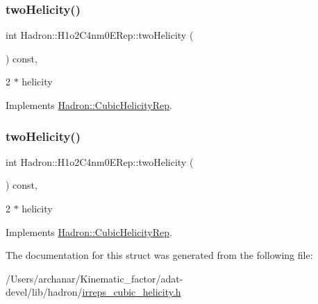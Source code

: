\subsubsection{\texorpdfstring{twoHelicity()}{twoHelicity()}\hspace{0.1cm}{\footnotesize\ttfamily [2/3]}}
{\footnotesize\ttfamily int Hadron\+::\+H1o2\+C4nm0\+E\+Rep\+::two\+Helicity (\begin{DoxyParamCaption}{ }\end{DoxyParamCaption}) const\hspace{0.3cm}{\ttfamily [inline]}, {\ttfamily [virtual]}}

2 $\ast$ helicity 

Implements \mbox{\hyperlink{structHadron_1_1CubicHelicityRep_af507aa56fc2747eacc8cb6c96db31ecc}{Hadron\+::\+Cubic\+Helicity\+Rep}}.

\mbox{\label{structHadron_1_1H1o2C4nm0ERep_a083d0736946f0404ac8639fd8a954a9d}} 
\subsubsection{\texorpdfstring{twoHelicity()}{twoHelicity()}\hspace{0.1cm}{\footnotesize\ttfamily [3/3]}}
{\footnotesize\ttfamily int Hadron\+::\+H1o2\+C4nm0\+E\+Rep\+::two\+Helicity (\begin{DoxyParamCaption}{ }\end{DoxyParamCaption}) const\hspace{0.3cm}{\ttfamily [inline]}, {\ttfamily [virtual]}}

2 $\ast$ helicity 

Implements \mbox{\hyperlink{structHadron_1_1CubicHelicityRep_af507aa56fc2747eacc8cb6c96db31ecc}{Hadron\+::\+Cubic\+Helicity\+Rep}}.



The documentation for this struct was generated from the following file\+:\begin{DoxyCompactItemize}
\item 
/\+Users/archanar/\+Kinematic\+\_\+factor/adat-\/devel/lib/hadron/\mbox{\hyperlink{adat-devel_2lib_2hadron_2irreps__cubic__helicity_8h}{irreps\+\_\+cubic\+\_\+helicity.\+h}}\end{DoxyCompactItemize}
